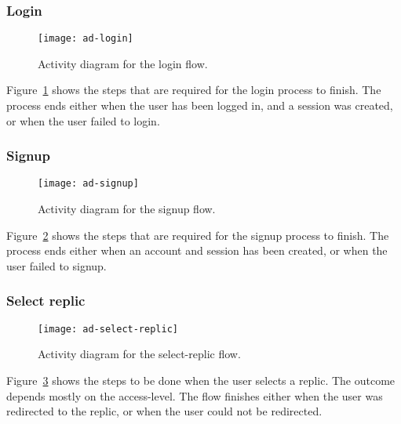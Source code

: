 \subsubsection{Login}
\begin{figure}
    \centering
    \texttt{[image: ad-login]}
    \caption{Activity diagram for the login flow.}
    \label{fig:ad:login}
\end{figure}

Figure~\ref{fig:ad:login} shows the steps that are required for the login process to finish.
The process ends either when the user has been logged in, and a session was created, or when the user failed to login.

\subsubsection{Signup}
\begin{figure}
    \centering
    \texttt{[image: ad-signup]}
    \caption{Activity diagram for the signup flow.}
    \label{fig:ad:signup}
\end{figure}

Figure~\ref{fig:ad:signup} shows the steps that are required for the signup process to finish.
The process ends either when an account and session has been created, or when the user failed to signup.

\subsubsection{Select replic}
\begin{figure}
    \centering
    \texttt{[image: ad-select-replic]}
    \caption{Activity diagram for the select-replic flow.}
    \label{fig:ad:select-replic}
\end{figure}

Figure~\ref{fig:ad:select-replic} shows the steps to be done when the user selects a replic.
The outcome depends mostly on the access-level.
The flow finishes either when the user was redirected to the replic, or when the user could not be redirected.